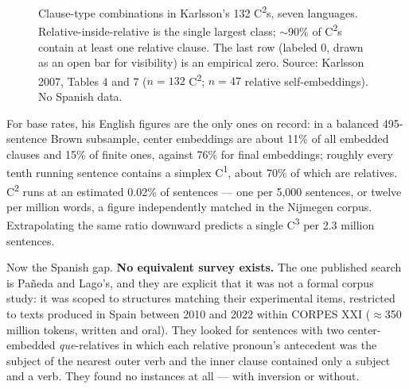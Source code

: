 \documentclass[11pt, a4paper]{article}
\begin{document}
\begin{figure}[htb]
\centering
{}
\caption{Clause-type combinations in Karlsson's 132 C\textsuperscript{2}s, seven languages. Relative-inside-relative is the single largest class; $\sim$90\% of C\textsuperscript{2}s contain at least one relative clause. The last row (labeled 0, drawn as an open bar for visibility) is an empirical zero. Source: Karlsson 2007, Tables 4 and 7 ($n=132$ C\textsuperscript{2}; $n=47$ relative self-embeddings). No Spanish data.}
\end{figure}

For base rates, his English figures are the only ones on record: in a balanced 495-sentence Brown subsample, center embeddings are about 11\% of all embedded clauses and 15\% of finite ones, against 76\% for final embeddings; roughly every tenth running sentence contains a simplex C\textsuperscript{1}, about 70\% of which are relatives. C\textsuperscript{2} runs at an estimated 0.02\% of sentences --- one per 5,000 sentences, or twelve per million words, a figure independently matched in the Nijmegen corpus. Extrapolating the same ratio downward predicts a single C\textsuperscript{3} per 2.3 million sentences.

Now the Spanish gap. \textbf{No equivalent survey exists.} The one published search is Pañeda and Lago's, and they are explicit that it was not a formal corpus study: it was scoped to structures matching their experimental items, restricted to texts produced in Spain between 2010 and 2022 within CORPES XXI ($\approx$350 million tokens, written and oral). They looked for sentences with two center-embedded \emph{que}-relatives in which each relative pronoun's antecedent was the subject of the nearest outer verb and the inner clause contained only a subject and a verb. They found no instances at all --- with inversion or without.
\end{document}
